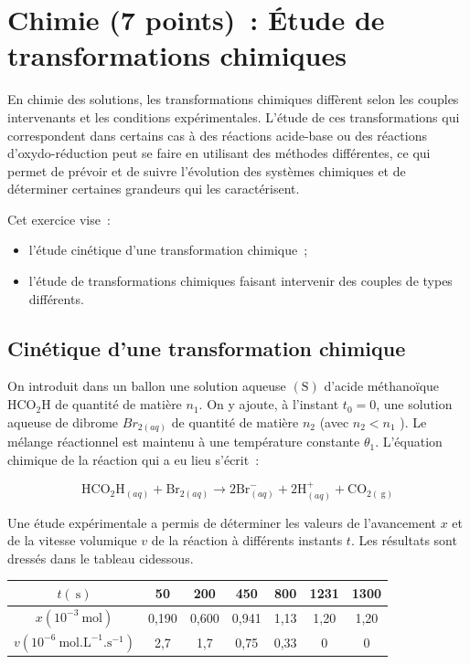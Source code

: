 \section*{Chimie (7 points)~: Étude de transformations chimiques}
En chimie des solutions, les transformations chimiques diffèrent selon les
couples intervenants et les conditions expérimentales. L'étude de ces
transformations qui correspondent dans certains cas à des réactions acide-base
ou des réactions d'oxydo-réduction peut se faire en utilisant des méthodes
différentes, ce qui permet de prévoir et de suivre l'évolution des systèmes
chimiques et de déterminer certaines grandeurs qui les caractérisent.

Cet exercice vise~:
\begin{itemize}
    \item l'étude cinétique d'une transformation chimique~;
    \item l'étude de transformations chimiques faisant intervenir des couples de types différents.
\end{itemize}

\subsection{Cinétique d'une transformation chimique}
On introduit dans un ballon une solution aqueuse $\mathrm{(S)}$ d'acide méthanoïque $\mathrm{HCO}_{2} \mathrm{H}$ de quantité de matière $n_{1}$. On y ajoute, à l'instant $t_{0}=0$, une solution aqueuse de dibrome $B r_{2(a q)}$ de quantité de matière $n_{2}$ (avec $n_{2}<n_{1}$ ). Le mélange réactionnel est maintenu à une température constante $\theta_{1}$. L'équation chimique de la réaction qui a eu lieu s'écrit~:

$$
\mathrm{HCO}_{2} \mathrm{H}_{(a q)}+\mathrm{Br}_{2(a q)} \rightarrow 2 \mathrm{Br}_{(a q)}^{-}+2 \mathrm{H}_{(a q)}^{+}+\mathrm{CO}_{2(\mathrm{~g})}
$$

Une étude expérimentale a permis de déterminer les valeurs de l'avancement $x$ et de la vitesse volumique $v$ de la réaction à différents instants $t$. Les résultats sont dressés dans le tableau cidessous.

\begin{center}
\begin{tabular}{|c|c|c|c|c|c|c|}
\hline
$t(\mathrm{~s})$ & 50 & 200 & 450 & 800 & 1231 & 1300 \\
\hline
$x\left(10^{-3} \mathrm{~mol}\right)$ & 0,190 & 0,600 & 0,941 & 1,13 & 1,20 & 1,20 \\
\hline
$v\left(10^{-6} \mathrm{~mol} . \mathrm{L}^{-1} . \mathrm{s}^{-1}\right)$ & 2,7 & 1,7 & 0,75 & 0,33 & 0 & 0 \\
\hline
\end{tabular}
\end{center}

